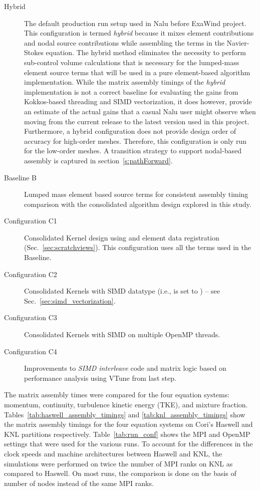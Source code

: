 \begin{description}
\item[Hybrid] The default production run setup used in Nalu before ExaWind
  project. This configuration is termed \emph{hybrid} because it mixes element
  contributions and nodal source contributions while assembling the terms in the
  Navier-Stokes equation. The hybrid method eliminates the necessity to perform
  sub-control volume calculations that is necessary for the lumped-mass element
  source terms that will be used in a pure element-based algorithm
  implementation. While the matrix assembly timings of the \emph{hybrid}
  implementation is not a correct baseline for evaluating the gains from
  Kokkos-based threading and SIMD vectorization, it does however, provide an
  estimate of the actual gains that a casual Nalu user might observe when moving
  from the current release to the latest version used in this project.
  Furthermore, a hybrid configuration does not provide design order of accuracy
  for high-order meshes. Therefore, this configuration is only run for the
  low-order meshes. A transition strategy to support nodal-based assembly
  is captured in section~\ref{s:pathForward}.
\item[Baseline B] Lumped mass element based source terms for consistent assembly
  timing comparison with the consolidated algorithm design explored in this
  study.
\item[Configuration C1] Consolidated Kernel design using  and element data
  registration (Sec.~\ref{sec:scratchviews}). This configuration uses all the
  terms used in the Baseline.
\item[Configuration C2] Consolidated Kernels with SIMD datatype (i.e.,
   is set to ) -- see
  Sec.~\ref{sec:simd_vectorization}.
\item[Configuration C3] Consolidated Kernels with SIMD on multiple OpenMP threads.
\item[Configuration C4] Improvements to \emph{SIMD interleave} code and matrix 
  logic based on performance analysis using VTune from last step.
\end{description}


The matrix assembly times were compared for the four equation systems: momentum,
continuity, turbulence kinetic energy (TKE), and mixture fraction.
Tables~\ref{tab:haswell_assembly_timings} and \ref{tab:knl_assembly_timings}
show the matrix assembly timings for the four equation systems on Cori's
Haswell and KNL partitions respectively. Table~\ref{tab:run_conf} shows the MPI
and OpenMP settings that were used for the various runs. To account for the
differences in the clock speeds and machine architectures between Haswell and
KNL, the simulations were performed on twice the number of MPI ranks on KNL as
compared to Haswell. On most runs, the comparison is done on the basis of number
of nodes instead of the same MPI ranks.


